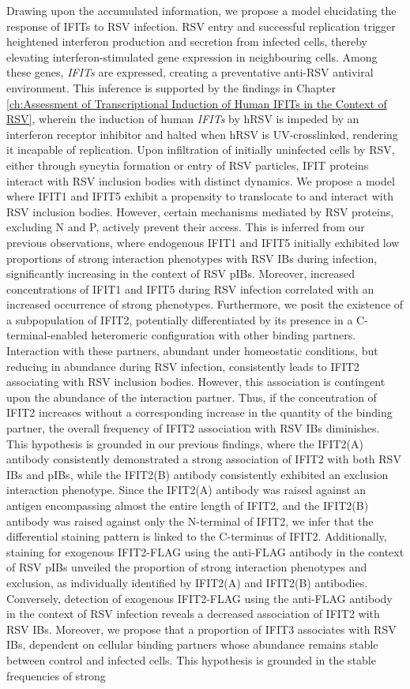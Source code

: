 Drawing upon the accumulated information, we propose a model elucidating the response of IFITs to RSV infection. RSV entry and successful replication trigger heightened interferon production and secretion from infected cells, thereby elevating interferon-stimulated gene expression in neighbouring cells. Among these genes, \textit{IFITs} are expressed, creating a preventative anti-RSV antiviral environment. This inference is supported by the findings in Chapter \ref{ch:Assessment of Transcriptional Induction of Human IFITs in the Context of RSV}, wherein the induction of human \textit{IFITs} by hRSV is impeded by an interferon receptor inhibitor and halted when hRSV is UV-crosslinked, rendering it incapable of replication. Upon infiltration of initially uninfected cells by RSV, either through syncytia formation or entry of RSV particles, IFIT proteins interact with RSV inclusion bodies with distinct dynamics. We propose a model where IFIT1 and IFIT5 exhibit a propensity to translocate to and interact with RSV inclusion bodies. However, certain mechanisms mediated by RSV proteins, excluding N and P, actively prevent their access. This is inferred from our previous observations, where endogenous IFIT1 and IFIT5 initially exhibited low proportions of strong interaction phenotypes with RSV IBs during infection, significantly increasing in the context of RSV pIBs. Moreover, increased concentrations of IFIT1 and IFIT5 during RSV infection correlated with an increased occurrence of strong phenotypes. Furthermore, we posit the existence of a subpopulation of IFIT2, potentially differentiated by its presence in a C-terminal-enabled heteromeric configuration with other binding partners. Interaction with these partners, abundant under homeostatic conditions, but reducing in abundance during RSV infection, consistently leads to IFIT2 associating with RSV inclusion bodies. However, this association is contingent upon the abundance of the interaction partner. Thus, if the concentration of IFIT2 increases without a corresponding increase in the quantity of the binding partner, the overall frequency of IFIT2 association with RSV IBs diminishes. This hypothesis is grounded in our previous findings, where the IFIT2(A) antibody consistently demonstrated a strong association of IFIT2 with both RSV IBs and pIBs, while the IFIT2(B) antibody consistently exhibited an exclusion interaction phenotype. Since the IFIT2(A) antibody was raised against an antigen encompassing almost the entire length of IFIT2, and the IFIT2(B) antibody was raised against only the N-terminal of IFIT2, we infer that the differential staining pattern is linked to the C-terminus of IFIT2. Additionally, staining for exogenous IFIT2-FLAG using the anti-FLAG antibody in the context of RSV pIBs unveiled the proportion of strong interaction phenotypes and exclusion, as individually identified by IFIT2(A) and IFIT2(B) antibodies. Conversely, detection of exogenous IFIT2-FLAG using the anti-FLAG antibody in the context of RSV infection reveals a decreased association of IFIT2 with RSV IBs. Moreover, we propose that a proportion of IFIT3 associates with RSV IBs, dependent on cellular binding partners whose abundance remains stable between control and infected cells. This hypothesis is grounded in the stable frequencies of strong 